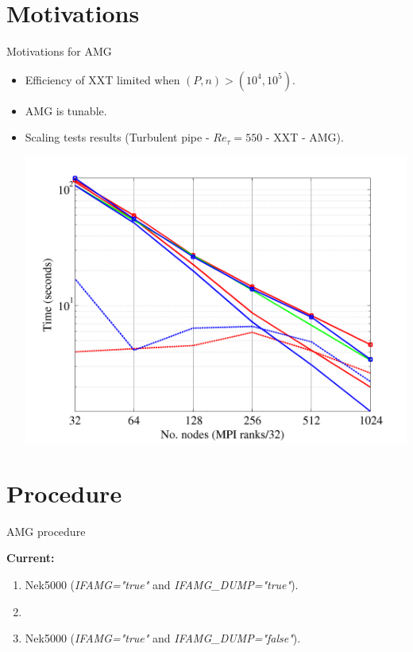 \documentclass[usenames,dvipsnames,svgnames,9pt]{beamer}
\begin{document}
\section{Motivations}

\begin{frame}{Motivations for AMG}
\begin{itemize}
\item Efficiency of XXT limited when $(P,n) > (10^4, 10^5)$.
\item AMG is tunable.
\item Scaling tests results (Turbulent pipe - $Re_{\tau} = 550$ - {\color{red} XXT} - {\color{blue} AMG}).

\centering
\includegraphics[width=0.7\linewidth]{BeskowReTau550.png}
\end{itemize}

\end{frame}

\section{Procedure}

\begin{frame}{AMG procedure}

\textbf{Current:}
\begin{enumerate}
\item Nek5000 (\textit{IFAMG="true"} and \textit{IFAMG\_DUMP="true"}).
\vspace{3mm}
\item {} 
\vspace{3mm}
\item Nek5000 (\textit{IFAMG="true"} and \textit{IFAMG\_DUMP="false"}).
\end{enumerate}

\vspace{4mm}


\vspace{4mm}


\end{frame}
\end{document}
